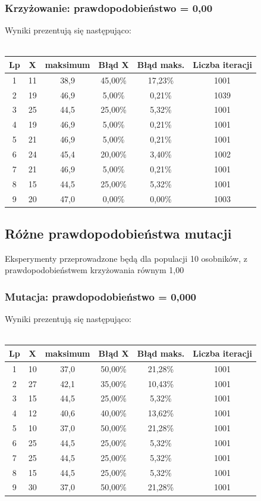 \documentclass[a4paper,11pt]{article}
\begin{document}
				\subsubsection{Krzyżowanie: prawdopodobieństwo = 0,00}
					Wyniki prezentują się następująco:\\~\\
					\begin{tabular}{|c|c|c|c|c|c|}
						\hline 
						Lp & X & maksimum & Błąd X & Błąd maks. & Liczba iteracji\\
						\hline
						1 & 11 & 38,9 & 45,00\% & 17,23\% & 1001 \\\hline
						2 & 19 & 46,9 & 5,00\% & 0,21\%& 1039 \\\hline
						3 & 25 & 44,5 & 25,00\% &5,32\% &1001 \\\hline
						4 & 19 & 46,9 & 5,00\% &0,21\% &1001 \\\hline
						5 & 21 & 46,9 & 5,00\% &0,21\% &1001 \\\hline
						6 & 24 & 45,4 & 20,00\% &3,40\% &1002 \\\hline
						7 & 21 & 46,9 & 5,00\% &0,21\% &1001 \\\hline
						8 & 15 & 44,5 & 25,00\% & 5,32\%&1001 \\\hline
						9 & 20 & 47,0 & 0,00\% & 0,00\%&1003 \\\hline
					\end{tabular} 
			\subsection{Różne prawdopodobieństwa mutacji}
				Eksperymenty przeprowadzone będą dla populacji 10 osobników, z prawdopodobieństwem krzyżowania równym 1,00
				\subsubsection{Mutacja: prawdopodobieństwo = 0,000}
					Wyniki prezentują się następująco:\\~\\
					\begin{tabular}{|c|c|c|c|c|c|}
						\hline 
						Lp & X & maksimum & Błąd X & Błąd maks. & Liczba iteracji\\
						\hline
						1 & 10 & 37,0 & 50,00\% &21,28\% &1001 \\\hline
						2 & 27 & 42,1 & 35,00\% &10,43\% &1001 \\\hline
						3 & 15 & 44,5 & 25,00\% &5,32\% &1001 \\\hline
						4 & 12 & 40,6 & 40,00\% &13,62\% &1001 \\\hline
						5 & 10 & 37,0 & 50,00\% &21,28\% &1001 \\\hline
						6 & 25 & 44,5 & 25,00\% &5,32\% &1001 \\\hline
						7 & 25 & 44,5 & 25,00\% & 5,32\%&1001 \\\hline
						8 & 15 & 44,5 & 25,00\% & 5,32\%&1001 \\\hline
						9 & 30 & 37,0 & 50,00\% & 21,28\%&1001 \\\hline
					\end{tabular} 
\end{document}
